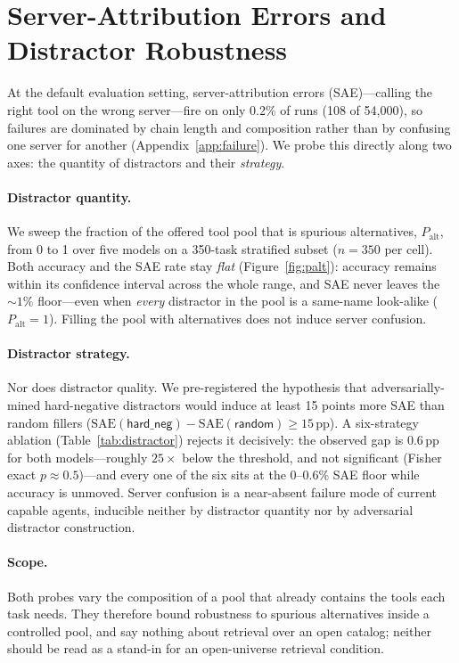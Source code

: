 \section{Server-Attribution Errors and Distractor Robustness}
\label{app:sae}
At the default evaluation setting, server-attribution errors (SAE)---calling
the right tool on the wrong server---fire on only 0.2\% of runs (108 of
54{,}000), so failures are dominated by chain length and composition rather
than by confusing one server for another (Appendix~\ref{app:failure}). We
probe this directly along two axes: the quantity of distractors and
their \emph{strategy}.

\paragraph{Distractor quantity.} We sweep the fraction of the offered tool pool
that is spurious alternatives, $P_\mathrm{alt}$, from 0 to 1 over five models on
a 350-task stratified subset ($n{=}350$ per cell). Both accuracy and the SAE
rate stay \emph{flat} (Figure~\ref{fig:palt}): accuracy remains within its
confidence interval across the whole range, and SAE never leaves the
${\sim}1\%$ floor---even when \emph{every} distractor in the pool is a same-name
look-alike ($P_\mathrm{alt}{=}1$). Filling the pool with alternatives does not
induce server confusion.

\paragraph{Distractor strategy.} Nor does distractor quality. We
pre-registered the hypothesis that adversarially-mined hard-negative distractors
would induce at least 15 points more SAE than random fillers
($\mathrm{SAE}(\textsf{hard\_neg}) - \mathrm{SAE}(\textsf{random}) \ge 15$\,pp).
A six-strategy ablation (Table~\ref{tab:distractor}) rejects it decisively: the
observed gap is $0.6$\,pp for both models---roughly $25\times$ below the
threshold, and not significant (Fisher exact $p \approx 0.5$)---and every one of
the six sits at the $0$--$0.6\%$ SAE floor while accuracy is unmoved. Server
confusion is a near-absent failure mode of current capable agents, inducible
neither by distractor quantity nor by adversarial distractor construction.

\paragraph{Scope.} Both probes vary the composition of a pool that already
contains the tools each task needs. They therefore bound robustness to
spurious alternatives inside a controlled pool, and say nothing about
retrieval over an open catalog; neither should be read as a stand-in for an
open-universe retrieval condition.

